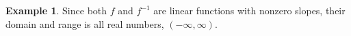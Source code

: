 \documentclass[11pt]{book}
\theoremstyle{definition}  %
\newtheorem{example}{Example}[chapter]
\begin{document}
\begin{example}
Since both $f$ and $f^{-1}$ are linear functions with nonzero slopes, their domain and range is all real numbers, $(-\infty,\infty)$.

\end{example}
\end{document}
